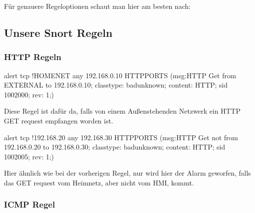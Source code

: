 \documentclass[letterpaper,10pt,ngerman]{sphinxmanual}
\begin{document}
\noindent{}

Für genauere Regeloptionen schaut man hier am besten nach:


\subsection{Unsere Snort Regeln}
\label{\detokenize{ids:unsere-snort-regeln}}

\subsubsection{HTTP Regeln}
\label{\detokenize{ids:http-regeln}}
\begin{sphinxVerbatim}[commandchars=\\\{\}]
alert tcp !\PYGZdl{}HOME\PYGZus{}NET any \PYGZhy{}\PYGZgt{} 192.168.0.10 \PYGZdl{}HTTP\PYGZus{}PORTS (msg:\PYGZdq{}HTTP Get from EXTERNAL to 192.168.0.10\PYGZdq{}; \PYGZbs{}
classtype: bad\PYGZhy{}unknown; content: \PYGZdq{}HTTP\PYGZdq{}; sid 1002000; rev: 1;)
\end{sphinxVerbatim}

Diese Regel ist dafür da, falls von einem Außenstehenden Netzwerk ein HTTP GET request empfangen worden ist.

\begin{sphinxVerbatim}[commandchars=\\\{\}]
alert tcp !192.168.20 any \PYGZhy{}\PYGZgt{} 192.168.30 \PYGZdl{}HTTP\PYGZus{}PORTS (msg:\PYGZdq{}HTTP Get not from 192.168.0.20 to 192.168.0.30\PYGZdq{}; \PYGZbs{}
classtype: bad\PYGZhy{}unknown; content: \PYGZdq{}HTTP\PYGZdq{}; sid 1002005; rev: 1;)
\end{sphinxVerbatim}

Hier ähnlich wie bei der vorherigen Regel, nur wird hier der Alarm geworfen, falls das GET request vom Heimnetz, aber nicht vom HMI, kommt.


\subsubsection{ICMP Regel}
\label{\detokenize{ids:icmp-regel}}

\begin{sphinxVerbatim}[commandchars=\\\{\}]
        \PYGZbs{}
     
\end{sphinxVerbatim}
\end{document}
